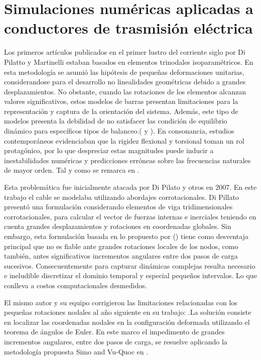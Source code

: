 \section{Simulaciones numéricas aplicadas a conductores de trasmisión eléctrica}\label{Sec:EA:AplicadasConductores}
Los primeros artículos publicados en el primer lustro del corriente siglo por Di Pilatto y Martinelli estaban basados en elementos trinodales isoparamétricos. En esta metodología se asumió las hipótesis de pequeñas deformaciones unitarias, considerandose para el desarrollo no linealidades geométricas debido a grandes desplazamientos. No obstante, cuando las rotaciones de los elementos alcanzan valores significativos, estos modelos de barras presentan limitaciones para la representación y captura de la orientación del sistema. Además, este tipo de modelos presenta la debilidad de no satisfacer las condición de equilibrio dinámico para específicos tipos de balanceo.(\cite{martinelli2001numerical} y \cite{Martinelli2004}). En consonancia, estudios contemporáneos evidenciaban que la rigidez flexional y torsional toman un rol protagónico, por lo que despreciar estas magnitudes puede inducir a inestabilidades numéricas y predicciones erróneas sobre las frecuencias naturales de mayor orden. Tal y como se remarca en \cite{koh2004dynamic}.

Esta problemática fue inicialmente atacada por Di Pilato y otros en 2007. En este trabajo el cable se modelaba utilizando abordajes corrotacionales. Di Pillato presentó una formulación considerando elementos de viga tridimensionales corrotacionales, para calcular el vector de fuerzas internas e inerciales teniendo en cuenta grandes desplazamientos y rotaciones en coordenadas globales. Sin embargo, esta formulación basada en lo propuesto por (\cite{oran1973tangent}) tiene como desventaja principal que no es fiable ante grandes rotaciones locales de los nodos, como también, antes significativos incrementos angulares entre dos pasos de carga sucesivos. Consecuentemente para capturar dinámicas complejas resulta necesario e ineludible discretizar el dominio temporal y especial pequeños intervalos. Lo que conlleva a costos computacionales desmedidos.

El mismo autor y su equipo corrigieron las limitaciones relacionadas con los pequeñas rotaciones nodales al año siguiente en su trabajo: \cite{di2008corotational}.La solución consiste en localizar las coordenadas nodales en la configuración deformada utilizando el teorema de ángulos de Euler. En este marco el impedimento de grandes incrementos angulares, entre dos pasos de carga, se resuelve aplicando la metodología propuesta Simo and Vu-Quoc en \cite{simo1988dynamics}.  


